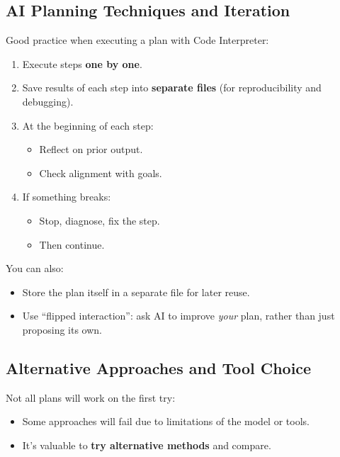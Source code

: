 \documentclass[
  letterpaper,
  DIV=11,
  numbers=noendperiod]{scrreprt}
\providecommand{\tightlist}{%
  \setlength{\itemsep}{0pt}\setlength{\parskip}{0pt}}
\begin{document}
\subsection{AI Planning Techniques and
Iteration}\label{ai-planning-techniques-and-iteration}

Good practice when executing a plan with Code Interpreter:

\begin{enumerate}
\def\labelenumi{\arabic{enumi}.}
\tightlist
\item
  Execute steps \textbf{one by one}.
\item
  Save results of each step into \textbf{separate files} (for
  reproducibility and debugging).
\item
  At the beginning of each step:

  \begin{itemize}
  \tightlist
  \item
    Reflect on prior output.
  \item
    Check alignment with goals.
  \end{itemize}
\item
  If something breaks:

  \begin{itemize}
  \tightlist
  \item
    Stop, diagnose, fix the step.
  \item
    Then continue.
  \end{itemize}
\end{enumerate}

You can also:

\begin{itemize}
\tightlist
\item
  Store the plan itself in a separate file for later reuse.
\item
  Use ``flipped interaction'': ask AI to improve \emph{your} plan,
  rather than just proposing its own.
\end{itemize}

\subsection{Alternative Approaches and Tool
Choice}\label{alternative-approaches-and-tool-choice}

Not all plans will work on the first try:

\begin{itemize}
\tightlist
\item
  Some approaches will fail due to limitations of the model or tools.
\item
  It's valuable to \textbf{try alternative methods} and compare.
\end{itemize}
\end{document}
